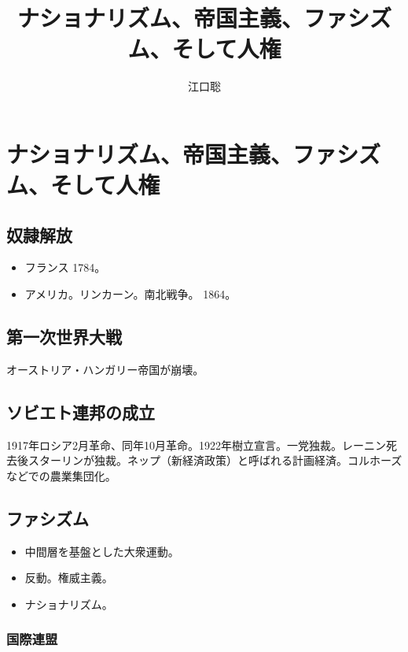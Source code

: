 \documentclass[uplatex,dvipdfmx]{jsarticle}\usepackage{mystyle}
\author{江口聡}
\title{ナショナリズム、帝国主義、ファシズム、そして人権}
\begin{document}
\maketitle

\else\chapter{ナショナリズム、帝国主義、ファシズム、そして人権}\fi


\section{奴隷解放}

\begin{itemize}
\item  フランス 1784。
\item アメリカ。リンカーン。南北戦争。 1864。
\end{itemize}





\section{第一次世界大戦}

オーストリア・ハンガリー帝国が崩壊。


\section{ソビエト連邦の成立}

1917年ロシア2月革命、同年10月革命。1922年樹立宣言。一党独裁。レーニン死去後スターリンが独裁。ネップ（新経済政策）と呼ばれる計画経済。コルホーズなどでの農業集団化。


\section{ファシズム}
\begin{itemize}
\item 中間層を基盤とした大衆運動。
\item 反動。権威主義。

\item ナショナリズム。
\end{itemize}


\nocite{水田洋91:社会思想史への招待,山脇直司92:ヨーロッパ社会思想史,水田洋06:社会思想小史}


\subsection{国際連盟}
\end{document}
